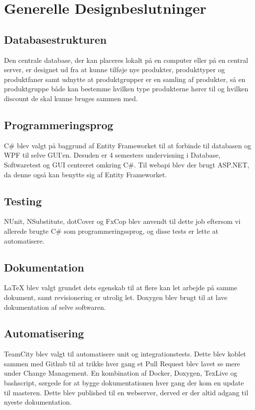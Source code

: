 \section{Generelle Designbeslutninger}

\subsection{Databasestrukturen}
Den centrale database, der kan placeres lokalt på en computer eller på en central server, er designet ud fra at kunne tilføje nye produkter, produkttyper og produktfaner samt udnytte at produktgrupper er en samling af produkter, så en produktgruppe både kan bestemme hvilken type produkterne hører til og hvilken discount de skal kunne bruges sammen med.

\subsection{Programmeringsprog}
C\# blev valgt på baggrund af Entity Frameworket til at forbinde til databasen og WPF til selve GUI'en. Desuden er 4 semesters undervisning i Database, Softwaretest og GUI centreret omkring C\#. Til webapi blev der brugt ASP.NET, da denne også kan benytte sig af Entity Frameworket.

\subsection{Testing}
NUnit, NSubstitute, dotCover og FxCop blev anvendt til dette job eftersom vi allerede brugte C\# som programmeringssprog, og disse tests er lette at automatisere.

\subsection{Dokumentation}
LaTeX blev valgt grundet dets egenskab til at flere kan let arbejde på samme dokument, samt revisionering er utrolig let. Doxygen blev brugt til at lave dokumentation af selve softwaren.

\subsection{Automatisering}
TeamCity blev valgt til automatisere unit og integrationstests. Dette blev koblet sammen med Github til at trikke hver gang et Pull Request blev lavet se mere under Change Management.
En kombination af Docker, Doxygen, TexLive og bashscript, sørgede for at bygge dokumentationen hver gang der kom en update til masteren. Dette blev published til en webserver, derved er der altid adgang til nyeste dokumentation.


